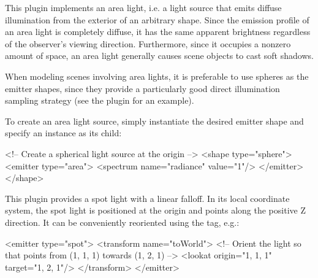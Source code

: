 This plugin implements an area light, i.e. a light source that emits
diffuse illumination from the exterior of an arbitrary shape.
Since the emission profile of an area light is completely diffuse, it
has the same apparent brightness regardless of the observer's viewing
direction. Furthermore, since it occupies a nonzero amount of space, an
area light generally causes scene objects to cast soft shadows.

When modeling scenes involving area lights, it is preferable
to use spheres as the emitter shapes, since they provide a
particularly good direct illumination sampling strategy (see
the  plugin for an example).

To create an area light source, simply instantiate the desired
emitter shape and specify an  instance as its child:

\vspace{4mm}
\begin{xml}
<!-- Create a spherical light source at the origin -->
<shape type="sphere">
    <emitter type="area">
        <spectrum name="radiance" value="1"/>
    </emitter>
</shape>
\end{xml}

This plugin provides a spot light with a linear falloff.
In its local coordinate system, the spot light is positioned at the origin
and points along the positive Z direction. It can be conveniently
reoriented using the  tag, e.g.:
\begin{xml}
<emitter type="spot">
    <transform name="toWorld">
        <!-- Orient the light so that points from (1, 1, 1) towards (1, 2, 1) -->
        <lookat origin="1, 1, 1" target="1, 2, 1"/>
    </transform>
</emitter>
\end{xml}

